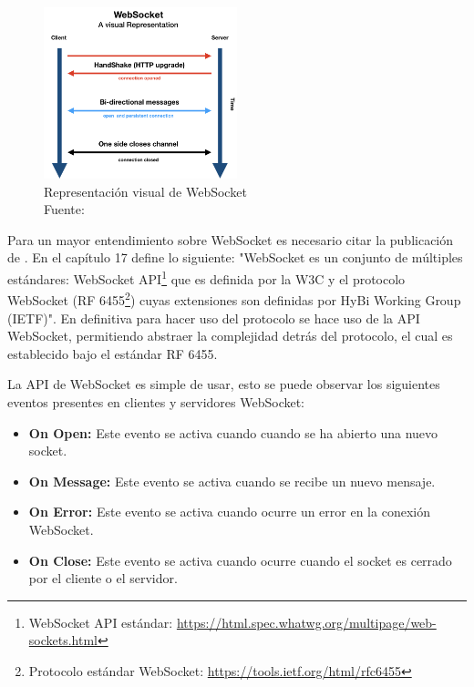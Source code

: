 \begin{figure}[H]
  \begin{center} 
   	\includegraphics[width=0.5\textwidth]{images/chapter02/websockets-guides-transparent.png} 
    \caption[Representación visual de WebSocket]{Representación visual de WebSocket \\Fuente: \cite{websocket-pubnub}} 
    \label{fig:WebSocket}
  \end{center}
\end{figure}

Para un mayor entendimiento sobre WebSocket es necesario citar la publicación de \cite{websocket-oreilly}. En el capítulo 17 define lo siguiente: "WebSocket es un conjunto de múltiples estándares: WebSocket API\footnote{WebSocket API estándar: \url{https://html.spec.whatwg.org/multipage/web-sockets.html}} que es definida por la W3C y el protocolo WebSocket (RF 6455\footnote{Protocolo estándar WebSocket: \url{https://tools.ietf.org/html/rfc6455} }) cuyas extensiones son definidas por HyBi Working Group (IETF)". En definitiva para hacer uso del protocolo se hace uso de la API  WebSocket, permitiendo abstraer la complejidad detrás del protocolo, el cual es establecido bajo el estándar RF 6455.

La API de WebSocket es simple de usar, esto se puede observar los siguientes eventos presentes en clientes y servidores WebSocket:

\begin{itemize}
		\item \textbf{On Open:} Este evento se activa cuando cuando se ha abierto una nuevo socket.
		\item \textbf{On Message:} Este evento se activa cuando se recibe un nuevo mensaje.
		\item \textbf{On Error:} Este evento se activa cuando ocurre un error en la conexión WebSocket.
		\item \textbf{On Close: }Este evento se activa cuando ocurre cuando el socket es cerrado por el cliente o el servidor. 
\end{itemize}




